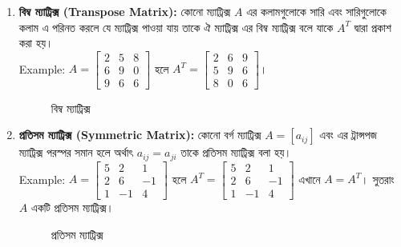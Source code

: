 \begin{enumerate}
	\item \textbf{বিম্ব ম্যাট্রিক্স (Transpose Matrix):} কোনো ম্যাট্রিক্স $A$ এর কলামগুলোকে সারি এবং সারিগুলোকে কলাম এ পরিনত করলে যে ম্যাট্রিক্স পাওয়া যায় তাকে ঐ ম্যাট্রিক্স এর বিম্ব ম্যাট্রিক্স বলে যাকে $A^T$ দ্বারা প্রকাশ করা হয়।\\ Example: 
	$A=\left[\begin{array}{ccc}
	2 & 5 & 8 \\
	6 & 9 & 0 \\
	9 & 6 & 6
	\end{array}\right]$ হলে 
	$A^T=\left[\begin{array}{ccc}
	2 & 6 & 9 \\
	5 & 9 & 6 \\
	8 & 0 & 6
	\end{array}\right]$।
	\begin{figure}[h]
		\centering
		
		\caption{বিম্ব ম্যাট্রিক্স}
		\label{mat-fig-2}
	\end{figure}
	
	\item \textbf{প্রতিসম ম্যাট্রিক্স (Symmetric Matrix):} কোনো বর্গ ম্যাট্রিক্স $A=[a_{ij}]$ এবং এর ট্রান্সপজ ম্যাট্রিক্স পরস্পর সমান হলে অর্থাৎ $a_{ij}=a_{ji}$ তাকে প্রতিসম ম্যাট্রিক্স বলা হয়।\\ Example: 
	$A=\left[\begin{array}{rrr}
	5 & 2 & 1 \\
	2 & 6 & -1 \\
	1 & -1 & 4
	\end{array}\right]
	$ হলে 
	$A^T=\left[\begin{array}{rrr}
	5 & 2 & 1 \\
	2 & 6 & -1 \\
	1 & -1 & 4
	\end{array}\right]$ এখানে $A=A^T$। সুতরাং $A$ একটি প্রতিসম ম্যাট্রিক্স।
	\begin{figure}[h]
		\centering
		
		\caption{প্রতিসম ম্যাট্রিক্স}
		\label{mat-fig-3}
	\end{figure}
	

\end{enumerate}
